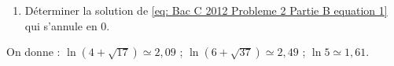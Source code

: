 \begin{description}
\begin{enumerate}
\begin{enumerate}
                                          si et seulement si $\varphi$ est une solution de 
                                          \eqref{eq: Bac C 2012 Probleme 2 Partie B equation 2}.
                                    \item En d\'eduire l'ensemble des solutions de 
                                          \eqref{eq: Bac C 2012 Probleme 2 Partie B equation 1}.
                              \end{enumerate}
                        \item D\'eterminer la solution de \eqref{eq: Bac C 2012 Probleme 2 Partie B equation 1}
                              qui s'annule en $0$.
                  \end{enumerate}
                  \begin{center}
                        On donne : $\ln (4+\sqrt{17}) \simeq 2,09$ ; $\ln (6+\sqrt{37}) \simeq 2,49$ ; $\ln 5 \simeq 1,61$.
                  \end{center}
      \end{description}




































